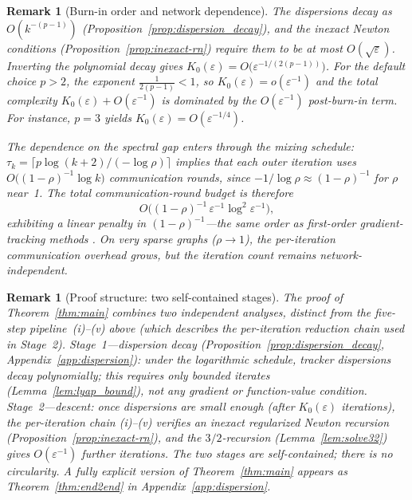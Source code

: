 \documentclass[11pt,a4paper]{article}
\def\cO{O}%
\newtheorem{remark}[theorem]{Remark}
\newcommand{\cO}{\mathcal{O}}
\begin{document}
\begin{remark}[Burn-in order and network dependence]\label{rem:burnin_order}
The dispersions decay as $\cO(k^{-(p-1)})$
(Proposition~\ref{prop:dispersion_decay}), and the inexact Newton
conditions (Proposition~\ref{prop:inexact-rn}) require them to be at
most $\cO(\sqrt\varepsilon)$.
Inverting the polynomial decay gives
$K_0(\varepsilon)=\cO\!\bigl(\varepsilon^{-1/(2(p-1))}\bigr)$.
For the default choice $p>2$, the exponent $\frac{1}{2(p-1)}<1$, so
$K_0(\varepsilon)=o(\varepsilon^{-1})$ and the total complexity
$K_0(\varepsilon)+\cO(\varepsilon^{-1})$ is dominated by the
$\cO(\varepsilon^{-1})$ post-burn-in term.
For instance, $p=3$ yields
$K_0(\varepsilon)=\cO(\varepsilon^{-1/4})$.

The dependence on the spectral gap enters through the mixing schedule:
$\tau_k=\lceil p\log(k+2)/(-\log\rho)\rceil$ implies that each
outer iteration uses $\cO\bigl((1-\rho)^{-1}\log k\bigr)$
communication rounds, since $-1/\log\rho\approx(1-\rho)^{-1}$ for
$\rho$ near~1.
The total communication-round budget is therefore
\[
\cO\bigl((1-\rho)^{-1}\,\varepsilon^{-1}\log^2\varepsilon^{-1}\bigr),
\]
exhibiting a \emph{linear} penalty in $(1-\rho)^{-1}$---the same
order as first-order gradient-tracking methods
\citep{nedic2017diging}.
On very sparse graphs ($\rho\to 1$), the per-iteration communication
overhead grows, but the iteration count remains network-independent.
\end{remark}

\begin{remark}[Proof structure: two self-contained stages]\label{rem:two_stages}
The proof of Theorem~\ref{thm:main} combines two independent
analyses, distinct from the five-step pipeline~(i)--(v) above
(which describes the \emph{per-iteration} reduction chain used
in Stage~2).
\emph{Stage~1---dispersion decay}
(Proposition~\ref{prop:dispersion_decay},
Appendix~\ref{app:dispersion}): under the logarithmic schedule,
tracker dispersions decay polynomially; this requires only
bounded iterates (Lemma~\ref{lem:lyap_bound}), not any gradient
or function-value condition.
\emph{Stage~2---descent}: once dispersions are small enough
(after $K_0(\varepsilon)$ iterations), the per-iteration chain
(i)--(v) verifies an inexact regularized Newton recursion
(Proposition~\ref{prop:inexact-rn}), and the $3/2$-recursion
(Lemma~\ref{lem:solve32}) gives $\cO(\varepsilon^{-1})$ further
iterations.
The two stages are self-contained; there is no circularity.
A fully explicit version of Theorem~\ref{thm:main} appears as
Theorem~\ref{thm:end2end} in Appendix~\ref{app:dispersion}.
\end{remark}
\end{document}
